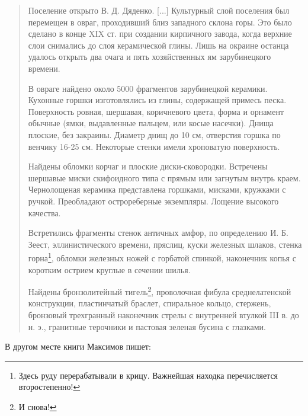 \begin{quotation}
Поселение открыто В. Д. Дяденко. [...] Культурный слой поселения был перемещен в овраг, проходивший близ западного склона горы. Это было сделано в конце XIX ст. при создании кирпичного завода, когда верхние слои снимались до слоя керамической глины. Лишь на окраине останца удалось открыть два очага и пять хозяйственных ям зарубинецкого времени. 

В овраге найдено около 5000 фрагментов зарубинецкой керамики. Кухонные горшки изготовлялись из глины, содержащей примесь песка. Поверхность ровная, шершавая, коричневого цвета, форма и орнамент обычные (ямки, выдавленные пальцем, или косые насечки). Днища плоские, без закраины. Диаметр днищ до 10 см, отверстия горшка по венчику 16-25 см. Некоторые стенки имели хроповатую поверхность. 

Найдены обломки корчаг и плоские диски-сковородки. Встречены шершавые миски скифоидного типа с прямым или загнутым внутрь краем. Чернолощеная керамика представлена горшками, мисками, кружками с ручкой. Преобладают острореберные экземпляры. Лощение высокого качества. 

Встретились фрагменты стенок античных амфор, по определению И. Б. Зеест, эллинистического времени, пряслиц, куски железных шлаков, стенка горна\footnote{Здесь руду перерабатывали в крицу. Важнейшая находка перечисляется второстепенно!}, обломки железных ножей с горбатой спинкой, наконечник копья с коротким острием круглые в сечении шилья. 

Найдены бронзолитейный тигель\footnote{И снова!}, проволочная фибула среднелатенской конструкции, пластинчатый браслет, спиральное кольцо, стержень, бронзовый трехгранный наконечник стрелы с внутренней втулкой III в. до н. э., гранитные терочники и пастовая зеленая бусина с глазками.
\end{quotation}

В другом месте книги Максимов пишет:

